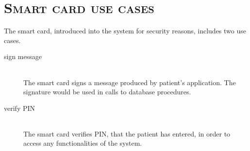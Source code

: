 \section{\textsc{Smart card use cases}}
The smart card, introduced into the system for security reasons, includes two use cases.
\begin{description}
\item[sign message] \hfill \\
The smart card signs a message produced by patient's application. 
The signature would be used in calls to database procedures.
\item[verify PIN] \hfill \\
The smart card verifies PIN, that the patient has entered, in order to access any functionalities of the system.
\end{description}




